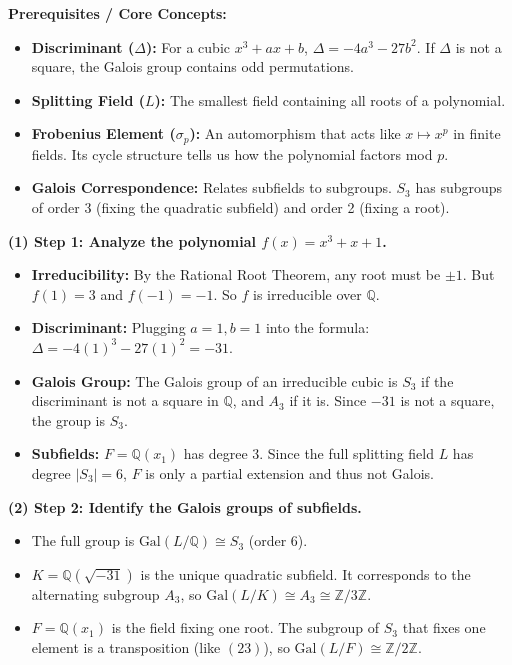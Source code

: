 \begin{solution}
\textbf{Prerequisites / Core Concepts:}
\begin{itemize}
    \item \textbf{Discriminant ($\Delta$):} For a cubic $x^3 + ax + b$, $\Delta = -4a^3 - 27b^2$. If $\Delta$ is not a square, the Galois group contains odd permutations.
    \item \textbf{Splitting Field ($L$):} The smallest field containing all roots of a polynomial.
    \item \textbf{Frobenius Element ($\sigma_p$):} An automorphism that acts like $x \mapsto x^p$ in finite fields. Its cycle structure tells us how the polynomial factors mod $p$.
    \item \textbf{Galois Correspondence:} Relates subfields to subgroups. $S_3$ has subgroups of order 3 (fixing the quadratic subfield) and order 2 (fixing a root).
\end{itemize}

\textbf{(1) Step 1: Analyze the polynomial $f(x) = x^3 + x + 1$.}
\begin{itemize}
    \item \textbf{Irreducibility:} By the Rational Root Theorem, any root must be $\pm 1$. But $f(1) = 3$ and $f(-1) = -1$. So $f$ is irreducible over $\mathbb{Q}$.
    \item \textbf{Discriminant:} Plugging $a=1, b=1$ into the formula: $\Delta = -4(1)^3 - 27(1)^2 = -31$.
    \item \textbf{Galois Group:} The Galois group of an irreducible cubic is $S_3$ if the discriminant is not a square in $\mathbb{Q}$, and $A_3$ if it is. Since $-31$ is not a square, the group is $S_3$.
    \item \textbf{Subfields:} $F = \mathbb{Q}(x_1)$ has degree 3. Since the full splitting field $L$ has degree $|S_3| = 6$, $F$ is only a partial extension and thus not Galois.
\end{itemize}

\textbf{(2) Step 2: Identify the Galois groups of subfields.}
\begin{itemize}
    \item The full group is $\text{Gal}(L/\mathbb{Q}) \cong S_3$ (order 6).
    \item $K = \mathbb{Q}(\sqrt{-31})$ is the unique quadratic subfield. It corresponds to the alternating subgroup $A_3$, so $\text{Gal}(L/K) \cong A_3 \cong \mathbb{Z}/3\mathbb{Z}$.
    \item $F = \mathbb{Q}(x_1)$ is the field fixing one root. The subgroup of $S_3$ that fixes one element is a transposition (like $(23)$), so $\text{Gal}(L/F) \cong \mathbb{Z}/2\mathbb{Z}$.
\end{itemize}


\end{solution}
